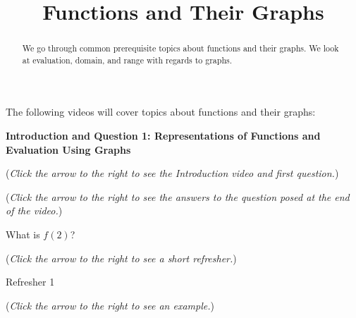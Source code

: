 \documentclass{ximera}
\title[Prerequisite Videos: ]{Functions and Their Graphs}
\begin{document}
\begin{abstract}
  We go through common prerequisite topics about functions and their graphs. 
  We look at evaluation, domain, and range with regards to graphs.
\end{abstract}
\maketitle

The following videos will cover topics about functions and their graphs:

\textbf{Introduction and Question 1: Representations of Functions and Evaluation Using Graphs}
\begin{question}
\begin{flushright}
{\color{blue}(\emph{Click the arrow to the right to see the Introduction video and first question.})}
\end{flushright}
\begin{center}
\begin{expandable}
{\color{blue}(\emph{Click the arrow to the right to see the answers 
to the question posed at the end of the video.})}
\begin{expandable}
What is $f(2)$?
\begin{multipleChoice}
\end{multipleChoice}
\begin{flushright}
{\color{blue}(\emph{Click the arrow to the right to see a short refresher.})}
\end{flushright}
\begin{expandable}
Refresher 1
\end{expandable}
\begin{flushright}
{\color{blue}(\emph{Click the arrow to the right to see an example.})}
\end{flushright}
\begin{expandable}
\end{expandable}
\end{expandable}
\end{expandable}
\end{center}
\end{question}
\end{document}
